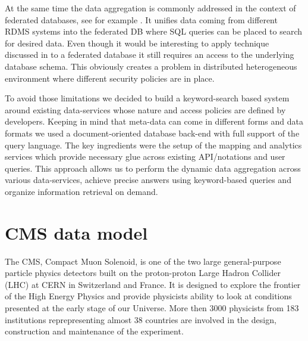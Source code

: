 \documentclass[a4paper]{jpconf}
\begin{document}
At the same time the data aggregation is commonly addressed in the context of
federated databases, see for example \cite{FedDB}. It unifies data coming 
from different RDMS systems into the federated DB where SQL queries can be placed to 
search for desired data. Even though it would be interesting to apply technique 
discussed in \cite{DBS-QL} to a federated database it still requires 
an access to the underlying database schema. This obviously creates a problem
in distributed heterogeneous environment where different security policies
are in place.

To avoid those limitations we decided to build a keyword-search based system around
existing data-services whose nature and access policies are defined by developers.
Keeping in mind that meta-data can come in different forms and data formats
we used a document-oriented database back-end with full support of the query language.
The key ingredients were the setup of the mapping and analytics services which provide
necessary glue across existing API/notations and user queries. This approach 
allows us to perform the dynamic data aggregation across various data-services, achieve
precise answers using keyword-based queries
and organize information retrieval on demand.

\section{CMS data model\label{DataModel}}
The CMS, Compact Muon Solenoid, \cite{CMS} 
is one of the two large general-purpose particle physics detectors built on 
the proton-proton Large Hadron Collider (LHC) at CERN in Switzerland and France. 
It is designed to explore the frontier of the High Energy Physics and provide physicists
ability to look at conditions presented at the early stage of our Universe.
More then 3000 physicists from 183 institutions reprepresenting almost 
38 countries are involved in the design, construction and maintenance of the experiment.
\end{document}
